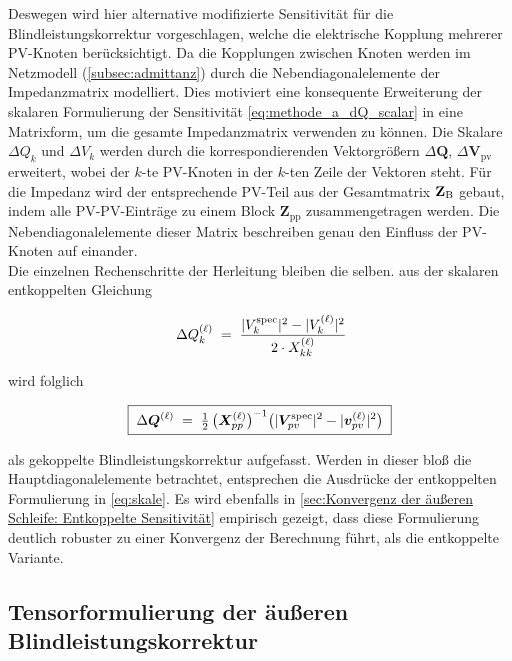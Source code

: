 Deswegen wird hier alternative modifizierte Sensitivität für die Blindleistungskorrektur vorgeschlagen, welche die elektrische Kopplung mehrerer PV-Knoten berücksichtigt. 
Da die Kopplungen zwischen Knoten werden im Netzmodell (\cref{subsec:admittanz}) durch die Nebendiagonalelemente der Impedanzmatrix modelliert. 
Dies motiviert eine konsequente Erweiterung der skalaren Formulierung der Sensitivität \eqref{eq:methode_a_dQ_scalar} in eine Matrixform, um die gesamte Impedanzmatrix verwenden zu können.
Die Skalare $\Delta Q_k$ und $\Delta V_{k}$ werden durch die korrespondierenden Vektorgrößern $\Delta\mathbf{Q}$,
$\Delta\mathbf{V}_{\mathrm{pv}}$ erweitert, wobei der $k$-te PV-Knoten in der $k$-ten Zeile der Vektoren steht.
Für die Impedanz wird der entsprechende PV-Teil aus der Gesamtmatrix $\mathbf{Z}_\mathrm{B}$ gebaut, indem alle PV-PV-Einträge zu einem Block %
$\mathbf{Z}_\mathrm{pp}$
zusammengetragen werden.
Die Nebendiagonalelemente dieser Matrix beschreiben genau den Einfluss der PV-Knoten auf einander.\\

Die einzelnen Rechenschritte der Herleitung bleiben die selben.
aus der skalaren entkoppelten Gleichung 

\begin{equation}
	\;\Delta Q^{(\ell)}_k \;=\; \frac{|V^{\mathrm{spec}}_k|^2 - |V^{(\ell)}_k|^2}{2\cdot X^{(\ell)}_{kk}}
	\label{eq:skale}
\end{equation} 

wird folglich 

\begin{equation}
	\boxed{\;\Delta\boldsymbol{Q}^{(\ell)} \;=\; \tfrac{1}{2}\,\bigl(\boldsymbol{X}^{(\ell)}_{pp}\bigr)^{-1} \bigl(|\boldsymbol{V}^{\mathrm{spec}}_{pv}|^2 - |\boldsymbol{v}^{(\ell)}_{pv}|^2\bigr) \;}
	\label{eq:methode_a_dQ_coupled}
\end{equation}

als gekoppelte Blindleistungskorrektur aufgefasst.
Werden in dieser bloß die Hauptdiagonalelemente betrachtet, entsprechen die Ausdrücke der entkoppelten Formulierung in \eqref{eq:skale}.
Es wird ebenfalls in \cref{sec:Konvergenz der äußeren Schleife: Entkoppelte Sensitivität} empirisch gezeigt, dass diese Formulierung deutlich robuster zu einer Konvergenz der Berechnung führt, als die entkoppelte Variante.


\subsection{Tensorformulierung der äußeren Blindleistungskorrektur}

